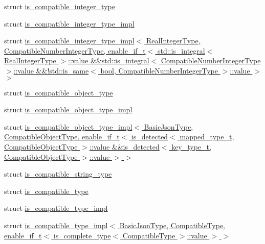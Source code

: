 \begin{DoxyCompactItemize}
\item 
struct \hyperlink{structnlohmann_1_1detail_1_1is__compatible__integer__type}{is\+\_\+compatible\+\_\+integer\+\_\+type}
\item 
struct \hyperlink{structnlohmann_1_1detail_1_1is__compatible__integer__type__impl}{is\+\_\+compatible\+\_\+integer\+\_\+type\+\_\+impl}
\item 
struct \hyperlink{structnlohmann_1_1detail_1_1is__compatible__integer__type__impl_3_01RealIntegerType_00_01Compatie5920c849e839ebb9f8c57349c900796}{is\+\_\+compatible\+\_\+integer\+\_\+type\+\_\+impl$<$ Real\+Integer\+Type, Compatible\+Number\+Integer\+Type, enable\+\_\+if\+\_\+t$<$ std\+::is\+\_\+integral$<$ Real\+Integer\+Type $>$\+::value \&\&std\+::is\+\_\+integral$<$ Compatible\+Number\+Integer\+Type $>$\+::value \&\&!std\+::is\+\_\+same$<$ bool, Compatible\+Number\+Integer\+Type $>$\+::value $>$ $>$}
\item 
struct \hyperlink{structnlohmann_1_1detail_1_1is__compatible__object__type}{is\+\_\+compatible\+\_\+object\+\_\+type}
\item 
struct \hyperlink{structnlohmann_1_1detail_1_1is__compatible__object__type__impl}{is\+\_\+compatible\+\_\+object\+\_\+type\+\_\+impl}
\item 
struct \hyperlink{structnlohmann_1_1detail_1_1is__compatible__object__type__impl_3_01BasicJsonType_00_01Compatible1dd1bd23ba0e4ce33237aa702f8058a9}{is\+\_\+compatible\+\_\+object\+\_\+type\+\_\+impl$<$ Basic\+Json\+Type, Compatible\+Object\+Type, enable\+\_\+if\+\_\+t$<$ is\+\_\+detected$<$ mapped\+\_\+type\+\_\+t, Compatible\+Object\+Type $>$\+::value \&\&is\+\_\+detected$<$ key\+\_\+type\+\_\+t, Compatible\+Object\+Type $>$\+::value $>$ $>$}
\item 
struct \hyperlink{structnlohmann_1_1detail_1_1is__compatible__string__type}{is\+\_\+compatible\+\_\+string\+\_\+type}
\item 
struct \hyperlink{structnlohmann_1_1detail_1_1is__compatible__type}{is\+\_\+compatible\+\_\+type}
\item 
struct \hyperlink{structnlohmann_1_1detail_1_1is__compatible__type__impl}{is\+\_\+compatible\+\_\+type\+\_\+impl}
\item 
struct \hyperlink{structnlohmann_1_1detail_1_1is__compatible__type__impl_3_01BasicJsonType_00_01CompatibleType_00_fa54cb60e66f5c6ba93b1dd3f418b703}{is\+\_\+compatible\+\_\+type\+\_\+impl$<$ Basic\+Json\+Type, Compatible\+Type, enable\+\_\+if\+\_\+t$<$ is\+\_\+complete\+\_\+type$<$ Compatible\+Type $>$\+::value $>$ $>$}
\item 

\end{DoxyCompactItemize}
